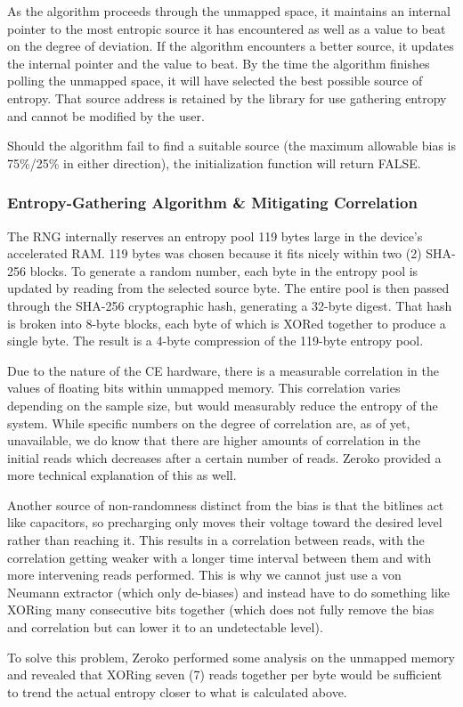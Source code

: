 \documentclass[titlepage]{report}
\begin{document}
	As the algorithm proceeds through the unmapped space, it maintains an internal pointer to the most entropic source it has encountered as well as a value to beat on the degree of deviation. If the algorithm encounters a better source, it updates the internal pointer and the value to beat. By the time the algorithm finishes polling the unmapped space, it will have selected the best possible source of entropy. That source address is retained by the library for use gathering entropy and cannot be modified by the user.
	
	Should the algorithm fail to find a suitable source (the maximum allowable bias is 75\%/25\% in either direction), the initialization function will return FALSE.
	
	\subsubsection{Entropy-Gathering Algorithm \& Mitigating Correlation}
	The RNG internally reserves an entropy pool 119 bytes large in the device’s accelerated RAM. 119 bytes was chosen because it fits nicely within two (2) SHA-256 blocks. To generate a random number, each byte in the entropy pool is updated by reading from the selected source byte. The entire pool is then passed through the SHA-256 cryptographic hash, generating a 32-byte digest. That hash is broken into 8-byte blocks, each byte of which is XORed together to produce a single byte. The result is a 4-byte compression of the 119-byte entropy pool.
	
	Due to the nature of the CE hardware, there is a measurable correlation in the values of floating bits within unmapped memory. This correlation varies depending on the sample size, but would measurably reduce the entropy of the system. While specific numbers on the degree of correlation are, as of yet, unavailable, we do know that there are higher amounts of correlation in the initial reads which decreases after a certain number of reads. Zeroko provided a more technical explanation of this as well.
	\begin{newquote}
		Another source of non-randomness distinct from the bias is that the bitlines act like capacitors, so precharging only moves their voltage toward the desired level rather than reaching it. This results in a correlation between reads, with the correlation getting weaker with a longer time interval between them and with more intervening reads performed. This is why we cannot just use a von Neumann extractor (which only de-biases) and instead have to do something like XORing many consecutive bits together (which does not fully remove the bias and correlation but can lower it to an undetectable level).  \footnotemark
	\end{newquote}
	To solve this problem, Zeroko performed some analysis on the unmapped memory and revealed that XORing seven (7) reads together per byte would be sufficient to trend the actual entropy closer to what is calculated above.
	
\end{document}
